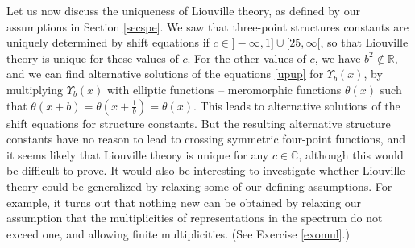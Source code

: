 \documentclass[12pt, a4paper, notitlepage, twoside]{report}
\numberwithin{equation}{section}
\theoremstyle{break}
\begin{document}
Let us now discuss the uniqueness of Liouville theory, as defined by our assumptions in Section \ref{secspe}. 
We saw that three-point structures constants are uniquely determined by shift equations if $c\in ]-\infty, 1] \cup [25,\infty[$, so that Liouville theory is unique for these values of $c$. 
For the other values of $c$, we have $b^2\notin\mathbb{R}$, and we can find alternative solutions of the equations \eqref{upup} for $\Upsilon_b(x)$, by multiplying $\Upsilon_b(x)$ with elliptic functions -- meromorphic functions $\theta(x)$ such that $\theta(x+b)=\theta(x+\frac{1}{b}) = \theta(x)$.
This leads to alternative solutions of the shift equations for structure constants.
But the resulting alternative structure constants have no reason to lead to crossing symmetric four-point functions, and it seems likely that Liouville theory is unique for any $c\in\mathbb{C}$, although this would be difficult to prove. 
It would also be interesting to investigate whether Liouville theory could be generalized by relaxing some of our defining assumptions. 
For example, it turns out that nothing new can be obtained by relaxing our assumption that the multiplicities of representations in the spectrum do not exceed one, and allowing finite multiplicities. (See Exercise \ref{exomul}.)
\end{document}
